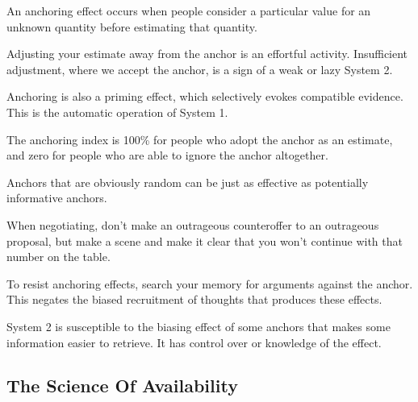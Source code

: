 \bit
\item An anchoring effect occurs when people consider a particular value for an unknown quantity before estimating
that quantity.
\item Adjusting your estimate away from the anchor is an effortful activity. Insufficient adjustment, where we accept
the anchor, is a sign of a weak or lazy System 2.
\item Anchoring is also a priming effect, which selectively evokes compatible evidence. This is the automatic
operation of System 1.
\item The anchoring index is 100\% for people who adopt the anchor as an estimate, and zero for people who are able
to ignore the anchor altogether.
\item Anchors that are obviously random can be just as effective as potentially informative anchors.
\item When negotiating, don't make an outrageous counteroffer to an outrageous proposal, but make a scene and make it
clear that you won't continue with that number on the table.
\item To resist anchoring effects, search your memory for arguments against the anchor. This negates the biased
recruitment of thoughts that produces these effects.
\item System 2 is susceptible to the biasing effect of some anchors that makes some information easier to retrieve.
It has control over or knowledge of the effect.
\eit

\subsection*{The Science Of Availability}

